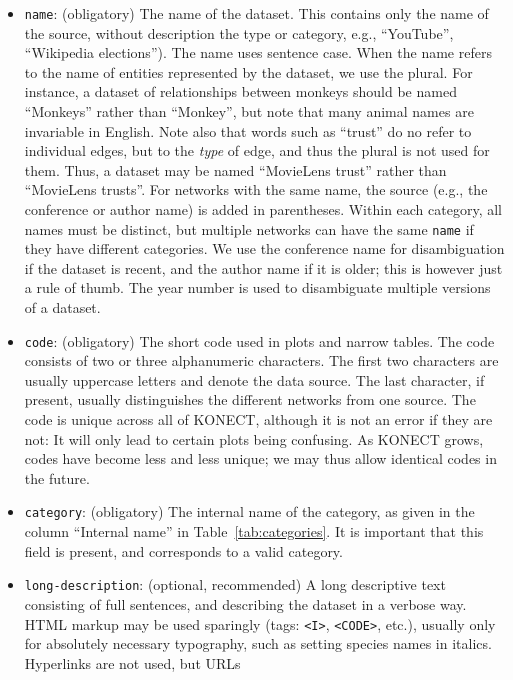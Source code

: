 \documentclass{article}
\begin{document}
\begin{itemize}
\item \texttt{name}: (obligatory) The name of the dataset.  This contains only the
  name of the source, without description the type or category,
  e.g., ``YouTube'', ``Wikipedia elections'').  The name uses
  sentence case.
  When the name refers to the name of entities represented by the
  dataset, we use the plural.  
  For instance, a dataset of relationships between monkeys should be named ``Monkeys'' rather than ``Monkey'',
  but note that many animal names are invariable in English.  
  Note also that words such as ``trust'' do no refer to individual
  edges, but to the \emph{type} of edge, and thus the plural is not used
  for them.  Thus, a dataset may be named ``MovieLens trust'' rather
  than ``MovieLens trusts''. 
  For networks with the same name, the source (e.g.,
  the conference or author name) is added in parentheses.  Within each category,
  all names must be distinct, but multiple networks can have the same
  \texttt{name} if they have different categories.  We use the
  conference name for disambiguation if the dataset is recent, and the
  author name if it is older; this is however just a rule of thumb.  The
  year number is used to disambiguate multiple versions of a dataset. 
\item \texttt{code}: (obligatory) The short code used in plots and narrow
  tables.  The code consists of two or three alphanumeric characters.  The first
  two characters are usually uppercase letters and denote the data
  source.  The last character, if present, usually distinguishes
  the different networks from one source.  The code is unique across all
  of KONECT, although it is not an error if they are not:  It will only
  lead to certain plots being confusing.  As KONECT grows, codes have become
  less and less unique; we may thus allow identical codes in the
  future. 
\item \texttt{category}: (obligatory) The internal name of the category, as given in the
  column ``Internal name'' in Table~\ref{tab:categories}.
  It is important that this field is present, and corresponds to a valid
  category. 
\item \texttt{long-description}: (optional, recommended) A long descriptive
  text consisting of full sentences, and describing the dataset in
  a verbose way.  HTML markup may be used sparingly (tags: \texttt{<I>}, \texttt{<CODE>},
  etc.), usually only for absolutely necessary typography, such as
  setting species names in italics.  Hyperlinks are not used, but URLs

\end{itemize}
\end{document}
